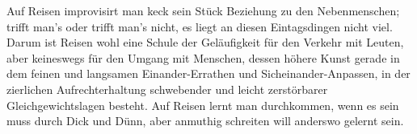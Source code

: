 Auf Reisen improvisirt man keck sein Stück Beziehung zu den Nebenmenschen; trifft man’s oder trifft man’s nicht, es liegt an diesen Eintagsdingen nicht viel. Darum ist Reisen wohl eine Schule der Geläufigkeit für den Verkehr mit Leuten, aber keineswegs für den Umgang mit Menschen, dessen höhere Kunst gerade in dem feinen und langsamen Einander-Errathen und Sicheinander-Anpassen, in der zierlichen Aufrechterhaltung schwebender und leicht zerstörbarer Gleichgewichtslagen besteht. Auf Reisen lernt man durchkommen, wenn es sein muss durch Dick und Dünn, aber anmuthig schreiten will anderswo gelernt sein.
\par

